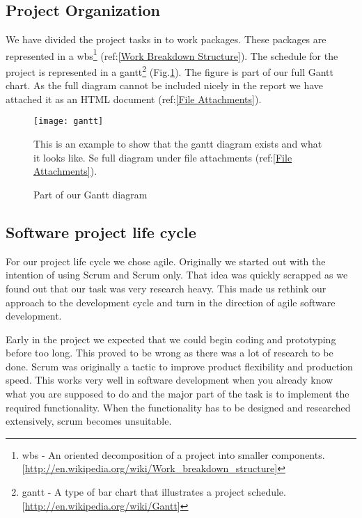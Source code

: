     \subsection{Project Organization}\label{Project Organization}
    
    We have divided the project tasks in to work packages. These packages are represented in a \gls{wbs}\footnote{\gls{wbs} - An oriented decomposition of a project into smaller components. [\url{http://en.wikipedia.org/wiki/Work_breakdown_structure}]} (ref:\ref{Work Breakdown Structure}). The schedule for the project is represented in a \gls{gantt}\footnote{\gls{gantt} - A type of bar chart that illustrates a project schedule. [\url{http://en.wikipedia.org/wiki/Gantt}]} (Fig.\ref{fig:gantt}). The figure is part of our full Gantt chart. As the full diagram cannot be included nicely in the report we have attached it as an HTML document (ref:\ref{File Attachments}).
     
        \begin{figure}[h]
            \centering
            \texttt{[image: gantt]}
            \caption{Part of our Gantt diagram} 
            This is an example to show that the gantt diagram exists and what it looks like. Se full diagram under file attachments (ref:\ref{File Attachments}).
            \label{fig:gantt}
        \end{figure}
    
    \subsection{Software project life cycle}\label{Software project life cycle}
    
    For our project life cycle we chose agile. Originally we started out with the intention of using Scrum and Scrum only. That idea was quickly scrapped as we found out that our task was very research heavy. This made us rethink our approach to the development cycle and turn in the direction of agile software development.
    
    Early in the project we expected that we could begin coding and prototyping before too long. This proved to be wrong as there was a lot of research to be done. Scrum was originally a tactic to improve product flexibility and production speed. This works very well in software development when you already know what you are supposed to do and the major part of the task is to implement the required functionality. When the functionality has to be designed and researched extensively, scrum becomes unsuitable. 
    

